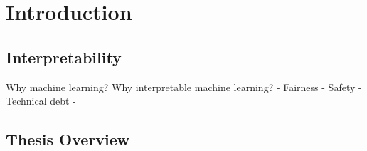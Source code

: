 \chapter{Introduction}
\section{Interpretability}
Why machine learning?
Why interpretable machine learning?
	- Fairness
	- Safety
	- Technical debt
	- 

\section{Thesis Overview}
